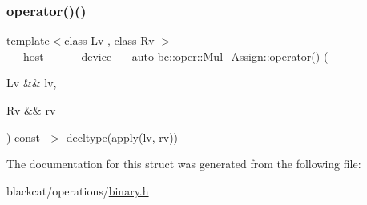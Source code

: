 \mbox{\label{structbc_1_1oper_1_1Mul__Assign_adf0fbc4cbdf93e42b696ab755c3f020d}} 
\subsubsection{\texorpdfstring{operator()()}{operator()()}}
{\footnotesize\ttfamily template$<$class Lv , class Rv $>$ \\
\+\_\+\+\_\+host\+\_\+\+\_\+ \+\_\+\+\_\+device\+\_\+\+\_\+ auto bc\+::oper\+::\+Mul\+\_\+\+Assign\+::operator() (\begin{DoxyParamCaption}\item[{Lv \&\&}]{lv,  }\item[{Rv \&\&}]{rv }\end{DoxyParamCaption}) const -\/$>$ decltype(\hyperlink{structbc_1_1oper_1_1Mul__Assign_a978e562d5cf0e2edc19854a626e1d40e}{apply}(lv, rv)) \hspace{0.3cm}{\ttfamily [inline]}}



The documentation for this struct was generated from the following file\+:\begin{DoxyCompactItemize}
\item 
blackcat/operations/\hyperlink{binary_8h}{binary.\+h}\end{DoxyCompactItemize}
